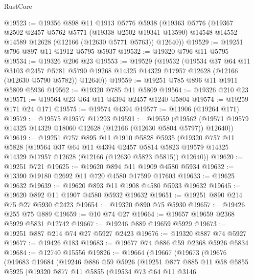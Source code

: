 \begin{lexlean}{RustCore}
\begin{coremodule}
@19523 := @19356
    @898
    @11
    @1913
    @5776
    @5938
    (@19363
      @5776
      (@19367
        @2502
        @2457
        @5762
        @5771
        (@19338 @2502 @19341 @13590)
        @14548
        @14552
        @14589
        @12628
        (@12166 (@12630 @5771 @5763))
        @12640))
@19529 := @19251 @796 @897 @11 @1912 @5795 @5937
@19532 := @19320 @796 @11 @5795
@19534 := @19326 @206 @23
@19553 := @19529
    (@19532
      (@19534
        @37
        @64
        @11
        @3103
        @2457
        @5781
        @5790
        @19268
        @14325
        @14329
        @17957
        @12628
        (@12166 (@12630 @5790 @5782))
        @12640))
@19559 := @19251 @785 @896 @11 @1911 @5809 @5936
@19562 := @19320 @785 @11 @5809
@19564 := @19326 @210 @23
@19571 := @19564 @23 @64 @11 @4394 @2457 @1240 @5804
@19574 := @19259 @171 @24 @171
@19575 := @19574 @4394
@19577 := @11906 (@19264 @171)
@19579 := @19575 @19577 @17293
@19591 := @19559
    (@19562 (@19571 @19579 @14325 @14329 @18060 @12628 (@12166 (@12630 @5804 @5797)) @12640))
@19619 := @19251
    @757
    @895
    @11
    @1910
    @5828
    @5935
    (@19320
      @757
      @11
      @5828
      (@19564
        @37
        @64
        @11
        @4394
        @2457
        @5814
        @5823
        @19579
        @14325
        @14329
        @17957
        @12628
        (@12166 (@12630 @5823 @5815))
        @12640))
@19620 := @19251 @721
@19625 := @19620 @894 @11 @1909 @4580 @5934
@19632 := @13390 @19180 @2692 @11 @720 @4580 @17599 @17603
@19633 := @19625 @19632
@19639 := @19620 @893 @11 @1908 @4580 @5933 @19632
@19645 := @19620 @892 @11 @1907 @4580 @5932 @19632
@19651 := @19251 @890 @214 @75 @27 @5930 @2423
@19654 := @19320 @890 @75 @5930
@19657 := @19426 @255 @75 @889
@19659 := @10 @74 @27
@19664 := @19657 @19659 @2368 @5929 @5831 @12742
@19667 := @19246 @889 @19659 @5929
@19673 := @19251 @887 @214 @74 @27 @5927 @2423
@19676 := @19320 @887 @74 @5927
@19677 := @19426 @183
@19683 := @19677 @74 @886 @59 @2368 @5926 @5834
@19684 := @12740 @15556
@19826 := @19664
    (@19667
      (@19673
        (@19676
          (@19683
            @19684
            (@19246
              @886
              @59
              @5926
              (@19251
                @877
                @885
                @11
                @58
                @5855
                @5925
                (@19320
                  @877
                  @11
                  @5855
                  (@19534
                    @73
                    @64
                    @11
                    @3146

\end{coremodule}
\end{lexlean}
